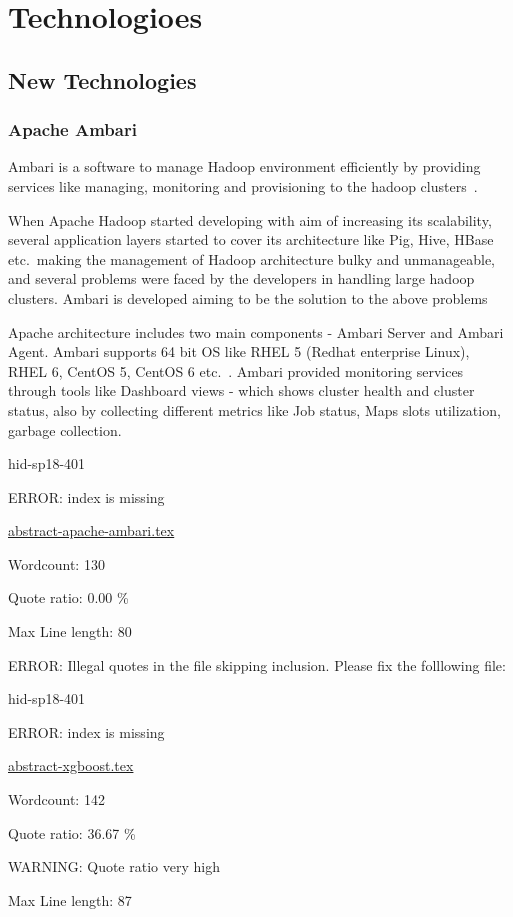 \part{Technologioes}
\chapter{New Technologies}
\section{Apache Ambari}  

Ambari is a software  to manage Hadoop environment
efficiently by providing services like managing, monitoring and provisioning to
the hadoop clusters~\cite{hid-sp18-401-wiki-Ambari}.

When Apache Hadoop started developing with aim of increasing its scalability,
several application layers started to cover its architecture like Pig, Hive,
HBase etc.\ making the management of Hadoop architecture bulky and unmanageable,
and several problems were faced by the developers in handling large hadoop
clusters. Ambari is developed aiming to be the solution to the above problems


Apache architecture includes two main components - Ambari Server and Ambari
Agent. Ambari supports 64 bit OS like RHEL 5 (Redhat enterprise Linux), RHEL 6,
CentOS 5, CentOS 6 etc.~\cite{hid-sp18-401-Ambari}. Ambari provided monitoring
services through tools like Dashboard views - which shows cluster health and
cluster status, also by collecting different metrics like Job status, Maps slots
utilization, garbage collection.



\begin{IU}

hid-sp18-401

ERROR: index is missing

\href{https://github.com/cloudmesh-community/hid-sp18-401/blob/master//technology/abstract-apache-ambari.tex}{abstract-apache-ambari.tex}

 

Wordcount: 130


Quote ratio: 0.00 \%
 
Max Line length: 80
\end{IU}

ERROR: Illegal quotes in the file skipping inclusion. Please fix the folllowing file:

\begin{IU}

hid-sp18-401

ERROR: index is missing

\href{https://github.com/cloudmesh-community/hid-sp18-401/blob/master//technology/abstract-xgboost.tex}{abstract-xgboost.tex}

 

Wordcount: 142


Quote ratio: 36.67 \%

WARNING: Quote ratio very high
 
Max Line length: 87
\end{IU}

